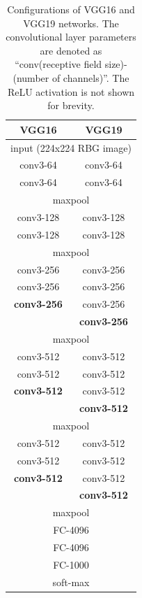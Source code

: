 \begin{table}[h]
\centering
\caption{Configurations of VGG16 and VGG19 networks. The convolutional layer parameters are denoted as "`conv(receptive field size)-(number of channels)"'. The ReLU activation is not shown for brevity.}
\label{table:vgg_model}
\begin{tabular}{|c|c|}
\hline
VGG16                     & VGG19                     \\
\hline
\multicolumn{2}{|c|}{input (224x224 RBG image)}       \\
\hline
conv3-64                  & conv3-64                  \\
conv3-64                  & conv3-64                  \\
\hline
\multicolumn{2}{|c|}{maxpool}                         \\
\hline
conv3-128                 & conv3-128                 \\
conv3-128                 & conv3-128                 \\
\hline
\multicolumn{2}{|c|}{maxpool}                         \\
\hline
conv3-256                 & conv3-256                 \\
conv3-256                 & conv3-256                 \\
\textbf{conv3-256}        & conv3-256                 \\
                          & \textbf{conv3-256}        \\
\hline
\multicolumn{2}{|c|}{maxpool}                         \\
\hline
conv3-512                 & conv3-512                 \\
conv3-512                 & conv3-512                 \\
\textbf{conv3-512}        & conv3-512                 \\
                          & \textbf{conv3-512}        \\
\hline
\multicolumn{2}{|c|}{maxpool}                         \\
\hline
conv3-512                 & conv3-512                 \\
conv3-512                 & conv3-512                 \\
\textbf{conv3-512}        & conv3-512                 \\
                          & \textbf{conv3-512}        \\
\hline
\multicolumn{2}{|c|}{maxpool}                         \\
\hline
\multicolumn{2}{|c|}{FC-4096}                         \\
\hline
\multicolumn{2}{|c|}{FC-4096}                         \\
\hline
\multicolumn{2}{|c|}{FC-1000}                         \\
\hline
\multicolumn{2}{|c|}{soft-max}                        \\
\hline
\end{tabular}
\end{table}

